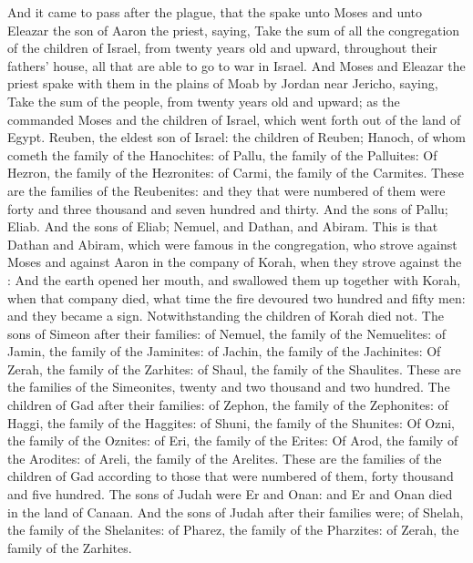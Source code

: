 \begin{biblechapter} %
 And it came to pass after the plague, that the \LORD spake unto Moses and unto Eleazar the son of Aaron the priest, saying,
\verse Take the sum of all the congregation of the children of Israel, from twenty years old and upward, throughout their fathers' house, all that are able to go to war in Israel.
\verse And Moses and Eleazar the priest spake with them in the plains of Moab by Jordan near Jericho, saying,
\verse Take the sum of the people, from twenty years old and upward; as the \LORD commanded Moses and the children of Israel, which went forth out of the land of Egypt.
\verse Reuben, the eldest son of Israel: the children of Reuben; Hanoch, of whom cometh the family of the Hanochites: of Pallu, the family of the Palluites:
\verse Of Hezron, the family of the Hezronites: of Carmi, the family of the Carmites.
\verse These are the families of the Reubenites: and they that were numbered of them were forty and three thousand and seven hundred and thirty.
\verse And the sons of Pallu; Eliab.
\verse And the sons of Eliab; Nemuel, and Dathan, and Abiram. This is that Dathan and Abiram, which were famous in the congregation, who strove against Moses and against Aaron in the company of Korah, when they strove against the \LORD:
\verse And the earth opened her mouth, and swallowed them up together with Korah, when that company died, what time the fire devoured two hundred and fifty men: and they became a sign.
\verse Notwithstanding the children of Korah died not.
\verse The sons of Simeon after their families: of Nemuel, the family of the Nemuelites: of Jamin, the family of the Jaminites: of Jachin, the family of the Jachinites:
\verse Of Zerah, the family of the Zarhites: of Shaul, the family of the Shaulites.
\verse These are the families of the Simeonites, twenty and two thousand and two hundred.
\verse The children of Gad after their families: of Zephon, the family of the Zephonites: of Haggi, the family of the Haggites: of Shuni, the family of the Shunites:
\verse Of Ozni, the family of the Oznites: of Eri, the family of the Erites:
\verse Of Arod, the family of the Arodites: of Areli, the family of the Arelites.
\verse These are the families of the children of Gad according to those that were numbered of them, forty thousand and five hundred.
\verse The sons of Judah were Er and Onan: and Er and Onan died in the land of Canaan.
\verse And the sons of Judah after their families were; of Shelah, the family of the Shelanites: of Pharez, the family of the Pharzites: of Zerah, the family of the Zarhites.

\end{biblechapter}
